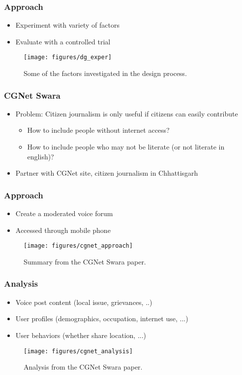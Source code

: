 \documentclass[10pt,mathserif]{beamer}
\begin{document}
\begin{frame}
  \frametitle{Approach}
  \begin{itemize}
  \item Experiment with variety of factors
  \item Evaluate with a controlled trial
  \end{itemize}
\begin{figure}[ht]
  \centering
  \texttt{[image: figures/dg\_exper]}
  \caption{Some of the factors investigated in the design process. \label{fig:label} }
\end{figure}

\end{frame}

\begin{frame}
  \frametitle{CGNet Swara}
  \begin{itemize}
  \item Problem: Citizen journalism is only useful if citizens can easily contribute
    \begin{itemize}
    \item How to include people without internet access?
    \item How to include people who may not be literate (or not literate in
      english)?
    \end{itemize}
  \item Partner with CGNet site, citizen journalism in Chhattisgarh
  \end{itemize}
\end{frame}

\begin{frame}
  \frametitle{Approach}
  \begin{itemize}
  \item Create a moderated voice forum
  \item Accessed through mobile phone
  \end{itemize}
  \begin{figure}[ht]
    \centering
    \texttt{[image: figures/cgnet\_approach]}
    \caption{Summary from the CGNet Swara paper.}
\end{figure}

\end{frame}

\begin{frame}
  \frametitle{Analysis}
  \begin{itemize}
  \item Voice post content (local issue, grievances, ..)
  \item User profiles (demographics, occupation, internet use, ...)
  \item User behaviors (whether share location, ...)
  \end{itemize}
  \begin{figure}[ht]
    \centering
    \texttt{[image: figures/cgnet\_analysis]}
    \caption{Analysis from the CGNet Swara paper.}
\end{figure}

\end{frame}
\end{document}
